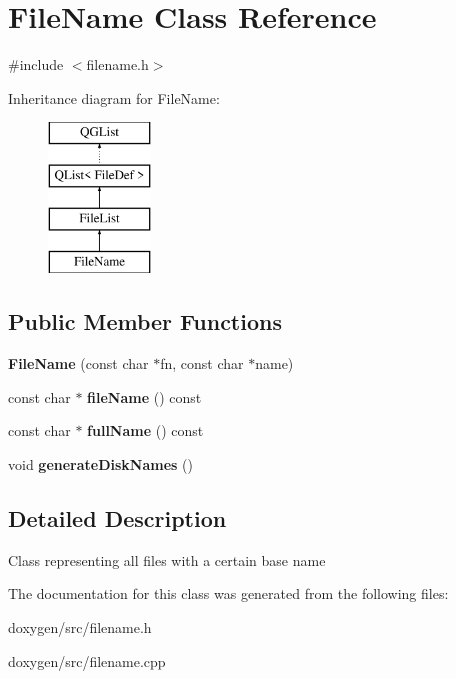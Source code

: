 \hypertarget{class_file_name}{}\section{File\+Name Class Reference}
\label{class_file_name}


{\ttfamily \#include $<$filename.\+h$>$}

Inheritance diagram for File\+Name\+:\begin{figure}[H]
\begin{center}
\leavevmode
\includegraphics[height=4.000000cm]{class_file_name}
\end{center}
\end{figure}
\subsection*{Public Member Functions}
\begin{DoxyCompactItemize}
\item 
\mbox{\label{class_file_name_aff3bb1609a0d4be83b2d63e6c0327bd6}} 
{\bfseries File\+Name} (const char $\ast$fn, const char $\ast$name)
\item 
\mbox{\label{class_file_name_a75c57d813621f8afacef37079fe48a17}} 
const char $\ast$ {\bfseries file\+Name} () const
\item 
\mbox{\label{class_file_name_a676f0b177365e3daa502bbb6dc9e9777}} 
const char $\ast$ {\bfseries full\+Name} () const
\item 
\mbox{\label{class_file_name_a156ef6131a30d885cf63d239a1a0263b}} 
void {\bfseries generate\+Disk\+Names} ()
\end{DoxyCompactItemize}


\subsection{Detailed Description}
Class representing all files with a certain base name 

The documentation for this class was generated from the following files\+:\begin{DoxyCompactItemize}
\item 
doxygen/src/filename.\+h\item 
doxygen/src/filename.\+cpp\end{DoxyCompactItemize}
